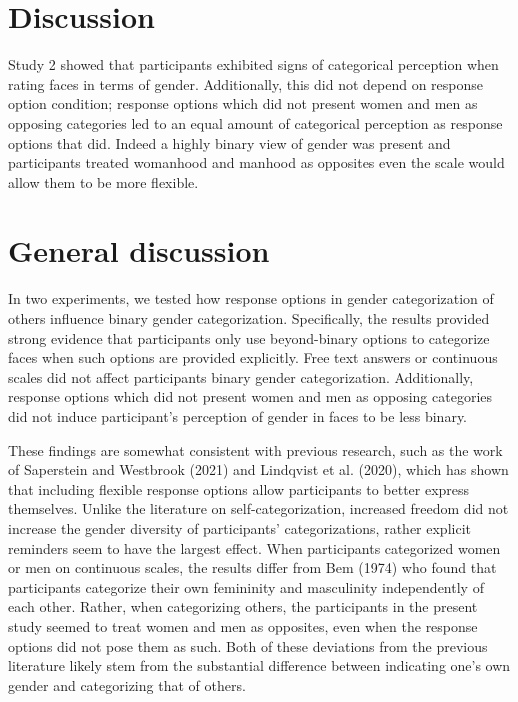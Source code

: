 \documentclass[
  man]{apa7}
\begin{document}
\hypertarget{discussion-1}{%
\section{Discussion}\label{discussion-1}}

Study 2 showed that participants exhibited signs of categorical perception when rating faces in terms of gender. Additionally, this did not depend on response option condition; response options which did not present women and men as opposing categories led to an equal amount of categorical perception as response options that did. Indeed a highly binary view of gender was present and participants treated womanhood and manhood as opposites even the scale would allow them to be more flexible.

\hypertarget{general-discussion}{%
\section{General discussion}\label{general-discussion}}

In two experiments, we tested how response options in gender categorization of others influence binary gender categorization. Specifically, the results provided strong evidence that participants only use beyond-binary options to categorize faces when such options are provided explicitly. Free text answers or continuous scales did not affect participants binary gender categorization. Additionally, response options which did not present women and men as opposing categories did not induce participant's perception of gender in faces to be less binary.

These findings are somewhat consistent with previous research, such as the work of Saperstein and Westbrook (2021) and Lindqvist et al. (2020), which has shown that including flexible response options allow participants to better express themselves. Unlike the literature on self-categorization, increased freedom did not increase the gender diversity of participants' categorizations, rather explicit reminders seem to have the largest effect. When participants categorized women or men on continuous scales, the results differ from Bem (1974) who found that participants categorize their own femininity and masculinity independently of each other. Rather, when categorizing others, the participants in the present study seemed to treat women and men as opposites, even when the response options did not pose them as such. Both of these deviations from the previous literature likely stem from the substantial difference between indicating one's own gender and categorizing that of others.
\end{document}
